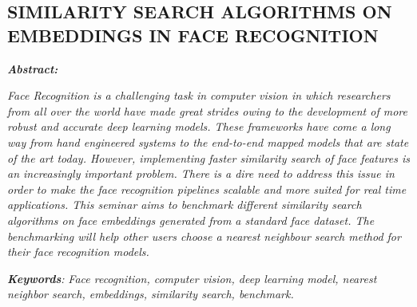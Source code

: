 \documentclass[12pt]{article}
\renewcommand{\_}{\kern-1.5pt\textunderscore\kern-1.5pt}
\begin{document}
\newpage
\begin{center}
\section*{SIMILARITY SEARCH ALGORITHMS ON \\EMBEDDINGS IN FACE RECOGNITION}
\end{center}
\par

 \par


\vspace{\baselineskip}
{\fontsize{14pt}{16.8pt}\selectfont \textbf{\textit{Abstract:}}\par}\par

\setlength{\parskip}{12.0pt}
\begin{justify}
\textit{Face Recognition is a challenging task in computer vision in which researchers from all over the world have made great strides owing to the development of more robust and accurate deep learning models. These frameworks have come a long way from hand engineered systems to the end-to-end mapped models that are state of the art today. However, implementing faster similarity search of face features is an increasingly important problem. There is a dire need to address this issue in order to make the face recognition pipelines scalable and more suited for real time applications. This seminar aims to benchmark different similarity search algorithms on face embeddings generated from a standard face dataset. The benchmarking will help other users choose a nearest neighbour search method for their face recognition models.}
\end{justify}\par

\begin{justify}
{\fontsize{14pt}{16.8pt}\selectfont \textbf{\textit{ }}\par}
\end{justify}\par

\begin{justify}
{\fontsize{14pt}{16.8pt}\selectfont \textbf{\textit{Keywords}}\textit{:} \textit{Face recognition, computer vision, deep learning model, nearest neighbor search, embeddings, similarity search, benchmark.}\par}
\end{justify}\par
\newpage
\end{document}
